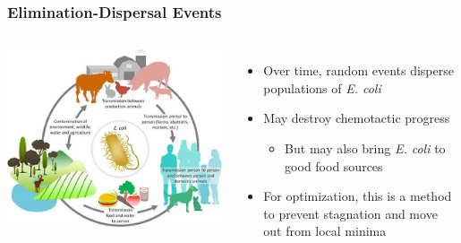 \documentclass{beamer}
\begin{document}
\begin{frame}
\frametitle{Elimination-Dispersal Events}
\begin{columns}[T]
\begin{center}
\includegraphics[scale=0.25]{assets/transmission.jpg}
\end{center}
\begin{itemize}
  \item<1-> Over time, random events disperse populations of \textit{E. coli}

  \item<2-> May destroy chemotactic progress
  \begin{itemize}
    \item<2-> But may also bring \textit{E. coli} to good food sources
  \end{itemize}
  \item<3-> For optimization, this is a method to prevent stagnation and move out from local minima
\end{itemize}
\end{columns}
\end{frame}
\end{document}
